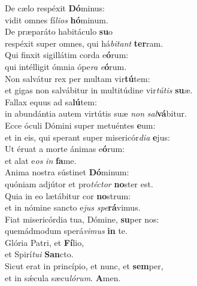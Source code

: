 \evenverse De cælo respéxit \textbf{Dó}minus:~\*\\
\evenverse vidit omnes fí\textit{li}\textit{os} \textbf{hó}minum.\\
\oddverse De præparáto habitáculo \textbf{su}o~\*\\
\oddverse respéxit super omnes, qui há\textit{bi}\textit{tant} \textbf{ter}ram.\\
\evenverse Qui finxit sigillátim corda e\textbf{ó}rum:~\*\\
\evenverse qui intélligit ómnia ópe\textit{ra} \textit{e}\textbf{ó}rum.\\
\oddverse Non salvátur rex per multam vir\textbf{tú}tem:~\*\\
\oddverse et gigas non salvábitur in multitúdine vir\textit{tú}\textit{tis} \textbf{su}æ.\\
\evenverse Fallax equus ad sa\textbf{lú}tem:~\*\\
\evenverse in abundántia autem virtútis suæ \textit{non} \textit{sal}\textbf{vá}bitur.\\
\oddverse Ecce óculi Dómini super metuéntes \textbf{e}um:~\*\\
\oddverse et in eis, qui sperant super misericór\textit{di}\textit{a} \textbf{e}jus:\\
\evenverse Ut éruat a morte ánimas e\textbf{ó}rum:~\*\\
\evenverse et alat e\textit{os} \textit{in} \textbf{fa}me.\\
\oddverse Anima nostra sústinet \textbf{Dó}minum:~\*\\
\oddverse quóniam adjútor et pro\textit{té}\textit{ctor} \textbf{no}ster est.\\
\evenverse Quia in eo lætábitur cor \textbf{no}strum:~\*\\
\evenverse et in nómine sancto e\textit{jus} \textit{spe}\textbf{rá}vimus.\\
\oddverse Fiat misericórdia tua, Dómine, \textbf{su}per nos:~\*\\
\oddverse quemádmodum sperá\textit{vi}\textit{mus} \textbf{in} te.\\
\evenverse Glória Patri, et \textbf{Fí}lio,~\*\\
\evenverse et Spirí\textit{tu}\textit{i} \textbf{San}cto.\\
\oddverse Sicut erat in princípio, et nunc, et \textbf{sem}per,~\*\\
\oddverse et in sǽcula sæcu\textit{ló}\textit{rum}. \textbf{A}men.\\
